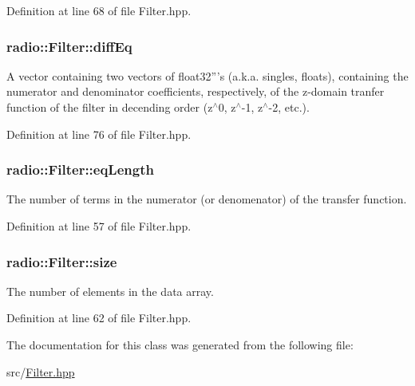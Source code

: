 Definition at line 68 of file Filter.\+hpp.

\hypertarget{classradio_1_1Filter_abe705768a267844edfa2aaabfdac9f56}{
\subsubsection[{diff\+Eq}]{ radio\+::\+Filter\+::diff\+Eq\hspace{0.3cm}{\ttfamily [protected]}}}\label{classradio_1_1Filter_abe705768a267844edfa2aaabfdac9f56}
A vector containing two vectors of float32'''s (a.\+k.\+a. singles, floats), containing the numerator and denominator coefficients, respectively, of the z-\/domain tranfer function of the filter in decending order (z$^\wedge$0, z$^\wedge$-\/1, z$^\wedge$-\/2, etc.). 

Definition at line 76 of file Filter.\+hpp.

\hypertarget{classradio_1_1Filter_a26a32320c4dffa8925ab5f0f06689e8d}{
\subsubsection[{eq\+Length}]{ radio\+::\+Filter\+::eq\+Length\hspace{0.3cm}{\ttfamily [protected]}}}\label{classradio_1_1Filter_a26a32320c4dffa8925ab5f0f06689e8d}
The number of terms in the numerator (or denomenator) of the transfer function. 

Definition at line 57 of file Filter.\+hpp.

\hypertarget{classradio_1_1Filter_a7285b4c7263d8278e38abb14b5dca5d9}{
\subsubsection[{size}]{ radio\+::\+Filter\+::size\hspace{0.3cm}{\ttfamily [protected]}}}\label{classradio_1_1Filter_a7285b4c7263d8278e38abb14b5dca5d9}
The number of elements in the data array. 

Definition at line 62 of file Filter.\+hpp.



The documentation for this class was generated from the following file\+:\begin{DoxyCompactItemize}
\item 
src/\hyperlink{Filter_8hpp}{Filter.\+hpp}\end{DoxyCompactItemize}
